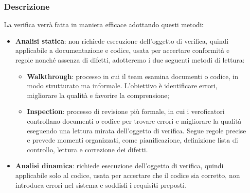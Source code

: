 \subsubsection{Descrizione}
La verifica verrà fatta in maniera efficace adottando questi metodi:
\begin{itemize}
    \item \textbf{Analisi statica}: non richiede esecuzione dell'oggetto di verifica, quindi applicabile a documentazione e codice, usata per accertare conformità e regole nonché assenza di difetti, adotteremo i due seguenti metodi di lettura:
          \begin{itemize}
              \item \textbf{Walkthrough}: processo in cui il team esamina documenti o codice, in modo strutturato ma informale. L'obiettivo è identificare errori, migliorare la qualità e favorire la comprensione;
              \item \textbf{Inspection}: processo di revisione più formale, in cui i veroficatori controllano documenti o codice per trovare errori e migliorare la qualità eseguendo una lettura mirata dell'oggetto di verifica. Segue regole precise e prevede momenti organizzati, come pianificazione, definizione lista di controllo, lettura e correzione dei difetti.
          \end{itemize}
    \item \textbf{Analisi dinamica}: richiede esecuzione dell'oggetto di verifica, quindi applicabile solo al codice, usata per accertare che il codice sia corretto, non introduca errori nel sistema e soddisfi i requisiti preposti.
\end{itemize}
